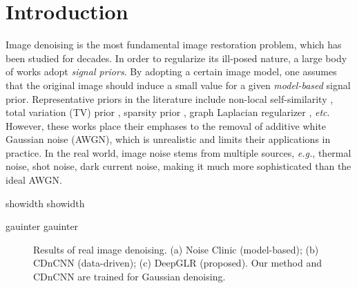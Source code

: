 \documentclass[10pt,twocolumn,letterpaper]{article}
\newcommand{\deflen}[2]{%
    \expandafter\newlength\csname #1\endcsname
    \expandafter\setlength\csname #1\endcsname{#2}%
}
\begin{document}
\section{Introduction}\label{sec:intro}
%


Image denoising is the most fundamental image restoration problem, which has been studied for decades. 
In order to regularize its ill-posed nature, a large body of works adopt \emph{signal priors}. 
By adopting a certain image model, one assumes that the original image should induce a small value for a given \emph{model-based} signal prior.
Representative priors in the literature include non-local self-similarity \cite{buades2005non}, total variation (TV) prior \cite{rudin1992nonlinear}, sparsity prior \cite{elad2006image}, graph Laplacian regularizer \cite{pang2017graph}, {\it etc}.
However, these works place their emphases to the removal of additive white Gaussian noise (AWGN), which is unrealistic and limits their applications in practice.
In the real world, image noise stems from multiple sources, {\it e.g.}, thermal noise, shot noise, dark current noise, making it much more sophisticated than the ideal AWGN.

\deflen{showidth}{75pt}
\deflen{gauinter}{0pt}
\begin{figure}[t]
\centering
        \hspace{\gauinter}
        \hspace{\gauinter}
 \caption{Results of real image denoising. (a) Noise Clinic (model-based); (b) CDnCNN (data-driven); (c) DeepGLR (proposed). Our method and CDnCNN are trained for Gaussian denoising.}
 \label{fig:intro}
\end{figure}
\end{document}
